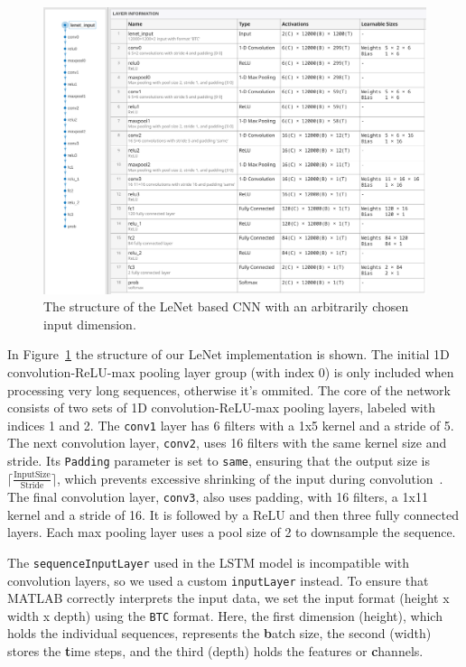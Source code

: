 \documentclass[a4paper,oneside,onecolumn,12pt]{book}
\begin{document}
	\begin{figure}[H]
	\begin{center}
		\includegraphics[width=\linewidth]{kep/lenet_structure.png}
		\caption{The structure of the LeNet based CNN with an arbitrarily chosen input dimension.}
		\label{fig:lenet_structure}
	\end{center}
	\end{figure}

	In Figure~\ref{fig:lenet_structure} the structure of our LeNet implementation is shown. The initial 1D convolution-ReLU-max pooling layer group (with index 0) is only included when processing very long sequences, otherwise it's ommited. The core of the network consists of two sets of 1D convolution-ReLU-max pooling layers, labeled with indices 1 and 2. The \texttt{conv1} layer has 6 filters with a 1x5 kernel and a stride of 5. The next convolution layer, \texttt{conv2}, uses 16 filters with the same kernel size and stride. Its \texttt{Padding} parameter is set to \texttt{same}, ensuring that the output size is $\lceil \frac{\text{InputSize}}{\text{Stride}} \rceil$, which prevents excessive shrinking of the input during convolution~\cite{1DCL}. The final convolution layer, \texttt{conv3}, also uses padding, with 16 filters, a 1x11 kernel and a stride of 16. It is followed by a ReLU and then three fully connected layers. Each max pooling layer uses a pool size of 2 to downsample the sequence.

	The \texttt{sequenceInputLayer} used in the LSTM model is incompatible with convolution layers, so we used a custom \texttt{inputLayer} instead. To ensure that MATLAB correctly interprets the input data, we set the input format (height x width x depth) using the \texttt{BTC} format. Here, the first dimension (height), which holds the individual sequences, represents the \textbf{b}atch size, the second (width) stores the \textbf{t}ime steps, and the third (depth) holds the features or \textbf{c}hannels.
\end{document}
